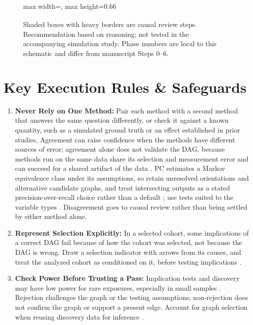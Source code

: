 \documentclass[10pt,a4paper]{article}
\begin{document}
\begin{figure}[H]
\begin{adjustbox}{max width=\textwidth, max height=0.66\textheight}
\begin{tikzpicture}[node distance=0.45cm and 1.3cm, auto]
\end{tikzpicture}
\end{adjustbox}

\vspace{0.1cm}
{\scriptsize Shaded boxes with heavy borders are causal review steps. \textsuperscript{\dag}Recommendation based on reasoning; not tested in the accompanying simulation study. Phase numbers are local to this schematic and differ from manuscript Steps 0--6.}
\end{figure}

\vspace{-0.4cm}

\section*{Key Execution Rules \& Safeguards}
\begin{enumerate}\small
    \item \textbf{Never Rely on One Method:} Pair each method with a second method that answers the same question differently, or check it against a known quantity, such as a simulated ground truth or an effect established in prior studies. Agreement can raise confidence when the methods have different sources of error; agreement alone does not validate the DAG, because methods run on the same data share its selection and measurement error and can succeed for a shared artifact of the data \citep{Lawlor2016,Reisach2021}. PC estimates a Markov equivalence class under its assumptions, so retain unresolved orientations and alternative candidate graphs, and treat intersecting outputs as a stated precision-over-recall choice rather than a default \citep{Maathuis2009}; use tests suited to the variable types \citep{Sedgewick2019}. Disagreement goes to causal review rather than being settled by either method alone.
    \item \textbf{Represent Selection Explicitly:} In a selected cohort, some implications of a correct DAG fail because of how the cohort was selected, not because the DAG is wrong. Draw a selection indicator with arrows from its causes, and treat the analyzed cohort as conditioned on it, before testing implications \citep{HernanSelection2004}.
    \item \textbf{Check Power Before Trusting a Pass:} Implication tests and discovery may have low power for rare exposures, especially in small samples \citep{Textor2016}. Rejection challenges the graph or the testing assumptions; non-rejection does not confirm the graph or support a present edge. Account for graph selection when reusing discovery data for inference \citep{Chang2026}.

\end{enumerate}
\end{document}

